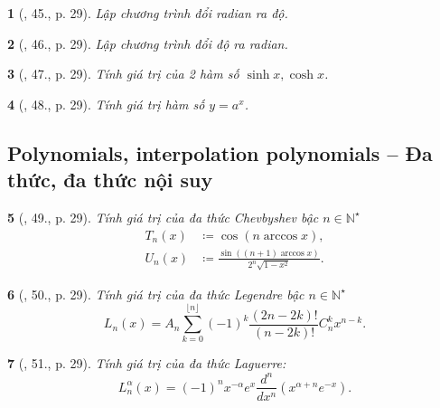 \documentclass{article}
\newtheorem{baitoan}{}
\begin{document}
\begin{baitoan}[\cite{Doanh_Tuan_Pascal}, 45., p. 29]
	Lập chương trình đổi radian ra độ.
\end{baitoan}

\begin{baitoan}[\cite{Doanh_Tuan_Pascal}, 46., p. 29]
	Lập chương trình đổi độ ra radian.
\end{baitoan}

\begin{baitoan}[\cite{Doanh_Tuan_Pascal}, 47., p. 29]
	Tính giá trị của 2 hàm số $\sinh x,\cosh x$.
\end{baitoan}

\begin{baitoan}[\cite{Doanh_Tuan_Pascal}, 48., p. 29]
	Tính giá trị hàm số $y = a^x$.
\end{baitoan}


\subsection{Polynomials, interpolation polynomials -- Đa thức, đa thức nội suy}

\begin{baitoan}[\cite{Doanh_Tuan_Pascal}, 49., p. 29]
	Tính giá trị của đa thức Chevbyshev bậc $n\in\mathbb{N}^\star$
	\begin{align*}
		T_n(x)&\coloneqq\cos(n\arccos x),\\
		U_n(x)&\coloneqq\frac{\sin((n + 1)\arccos x)}{2^n\sqrt{1 - x^2}}.
	\end{align*}
\end{baitoan}

\begin{baitoan}[\cite{Doanh_Tuan_Pascal}, 50., p. 29]
	Tính giá trị của đa thức Legendre bậc $n\in\mathbb{N}^\star$
	\begin{equation*}
		L_n(x) = A_n\sum_{k=0}^{\lfloor n\rfloor} (-1)^k\frac{(2n - 2k)!}{(n - 2k)!}C_n^kx^{n - k}.
	\end{equation*}
\end{baitoan}

\begin{baitoan}[\cite{Doanh_Tuan_Pascal}, 51., p. 29]
	Tính giá trị của đa thức Laguerre:
	\begin{equation*}
		L_n^\alpha(x) = (-1)^nx^{-\alpha}e^x\frac{d^n}{dx^n}(x^{\alpha + n}e^{-x}).
	\end{equation*}
\end{baitoan}
\end{document}
